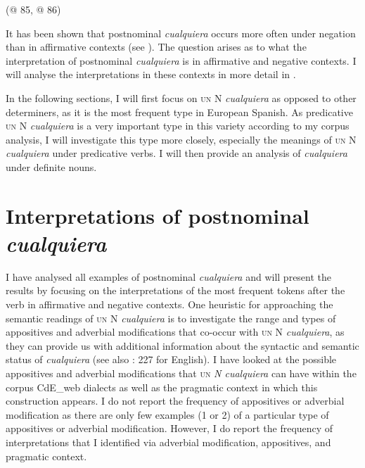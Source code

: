   (@ 85, @ 86)
\z
 

It has been shown that postnominal \textit{cualquiera} occurs more often under negation than in affirmative contexts (see ). The question arises as to what the interpretation of postnominal \textit{cualquiera} is in affirmative and negative contexts. I will analyse the interpretations in these contexts in more detail in .

In the following sections, I will first focus on \textsc{un} N \textit{cualquiera} as opposed to other determiners, as it is the most frequent type in European Spanish.  As predicative \textsc{un} N \textit{cualquiera} is a very important type in this variety according to my corpus analysis, I will investigate this type more closely, especially the meanings of \textsc{un} N \textit{cualquiera} under predicative verbs. I will then provide an analysis of \textit{cualquiera} under definite nouns. 

\section{{Interpretations} {of} {postnominal} {\textit{cualquiera}}} \label{sec:3.2}

{I have analysed all examples of postnominal \textit{cualquiera} and will present the results by focusing on the interpretations of the most frequent tokens after the verb in affirmative and negative contexts. One heuristic for approaching the semantic readings of \textsc{un} N \textit{cualquiera} is to investigate the range and types of appositives and adverbial modifications that co-occur with \textsc{un} N \textit{cualquiera}, as they can provide us with additional information about the syntactic and semantic status of \textit{cualquiera} (see also \citealt{Condoravdi2015}: 227 for English). I have looked at the possible appositives and adverbial modifications that \textsc{un} \textit{N cualquiera} can have within the corpus CdE\_web dialects as well as the pragmatic context in which this construction appears. I do not report the frequency of appositives or adverbial modification as there are only few examples (1 or 2) of a particular type of appositives or adverbial modification. However, I do report the frequency of interpretations that I identified via adverbial modification, appositives, and pragmatic context.}

